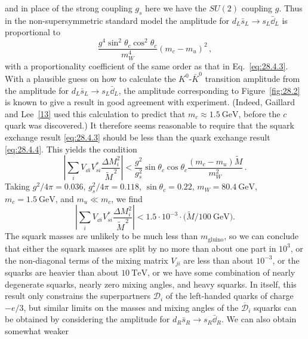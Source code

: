 and in place of the strong coupling \(g_s\) here we have the \(SU(2)\)
coupling \(g\). Thus in the non-supersymmetric standard model the
amplitude for
\(d_L\bar{s}_L\longrightarrow s_L\bar{\dd}_L\) is proportional to
\begin{equation}
  \frac{g^4\sin^2\theta_c\cos^2\theta_c}{m_W^4}
  (m_c-m_u)^2\,,
  \tag{28.4.4}\label{eq:28.4.4}
\end{equation}
with a proportionality coefficient of the same order as that in
Eq.~\eqref{eq:28.4.3}. With a plausible guess on how to calculate the
\(K^0\)-\(\bar K^0\) transition amplitude from the amplitude for
\(d_L\bar{s}_L\longrightarrow s_L\bar{\dd}_L\), the amplitude
corresponding to Figure~\ref{fig:28.2} is known to give a result in good
agreement with experiment. (Indeed, Gaillard and
Lee~\hyperref[ch28-ref-13]{[13]} used this calculation to predict that
\(m_c\approx1.5\ \mathrm{GeV}\), before the \(c\) quark was discovered.)
It therefore seems reasonable to require that the squark exchange result
\eqref{eq:28.4.3} should be less than the quark exchange result
\eqref{eq:28.4.4}. This yields the condition
\begin{equation}
  \left|
    \sum_iV_{\dd i}V_{si}^*\frac{\Delta M_i^2}{\widetilde{M}^{\,2}}
  \right|
  <
  \frac{g^2}{g_s^2}\sin\theta_c\cos\theta_c
  \frac{(m_c-m_u)\widetilde{M}}{m_W^2}\,.
  \tag{28.4.5}\label{eq:28.4.5}
\end{equation}
Taking \(g^2/4\pi=0.036\), \(g_s^2/4\pi=0.118\),
\(\sin\theta_c=0.22\), \(m_W=80.4\ \mathrm{GeV}\),
\(m_c=1.5\ \mathrm{GeV}\), and \(m_u\ll m_c\), we find
\begin{equation}
  \left|
    \sum_iV_{\dd i}V_{si}^*\frac{\Delta M_i^2}{\widetilde{M}^{\,2}}
  \right|
  <1.5\mathbin{\cdot}10^{-3}
  \mathbin{\cdot}
  \bigl(\widetilde{M}/100\ \mathrm{GeV}\bigr).
  \tag{28.4.6}\label{eq:28.4.6}
\end{equation}
The squark masses are unlikely to be much less than
\(m_{\mathrm{gluino}}\), so we can conclude that either the squark masses
are split by no more than about one part in \(10^3\), or the non-diagonal
terms of the mixing matrix \(V_{ji}\) are less than about \(10^{-3}\), or
the squarks are heavier than about \(10\ \mathrm{TeV}\), or we have some
combination of nearly degenerate squarks, nearly zero mixing angles, and
heavy squarks. In itself, this result only constrains the superpartners
\(\mathcal{D}_i\) of the left-handed quarks of charge \(-e/3\), but
similar limits on the masses and mixing angles of the
\(\overline{\mathcal{D}}_i\) squarks can be obtained by considering the
amplitude for
\(d_R\bar{s}_R\longrightarrow s_R\bar{\dd}_R\). We can also obtain
somewhat weaker

